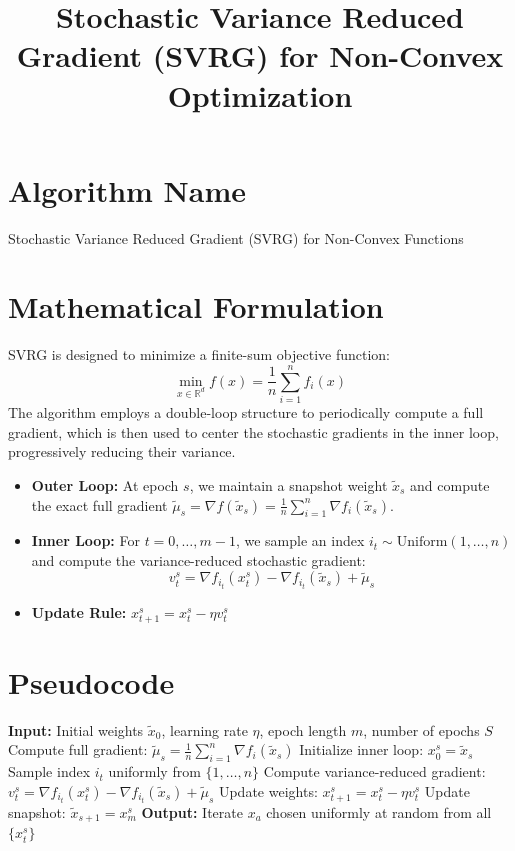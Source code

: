 \documentclass[11pt]{article}
\title{Stochastic Variance Reduced Gradient (SVRG) for Non-Convex Optimization}
\author{}
\date{}
\begin{document}
\maketitle

\section*{Algorithm Name}
Stochastic Variance Reduced Gradient (SVRG) for Non-Convex Functions

\section*{Mathematical Formulation}
SVRG is designed to minimize a finite-sum objective function:
\begin{equation}
    \min_{x \in \mathbb{R}^d} f(x) = \frac{1}{n} \sum_{i=1}^n f_i(x)
\end{equation}
The algorithm employs a double-loop structure to periodically compute a full gradient, which is then used to center the stochastic gradients in the inner loop, progressively reducing their variance.

\begin{itemize}
    \item \textbf{Outer Loop:} At epoch $s$, we maintain a snapshot weight $\tilde{x}_s$ and compute the exact full gradient $\tilde{\mu}_s = \nabla f(\tilde{x}_s) = \frac{1}{n}\sum_{i=1}^n \nabla f_i(\tilde{x}_s)$.
    \item \textbf{Inner Loop:} For $t = 0, \dots, m-1$, we sample an index $i_t \sim \text{Uniform}(1, \dots, n)$ and compute the variance-reduced stochastic gradient:
    \begin{equation}
        v_t^s = \nabla f_{i_t}(x_t^s) - \nabla f_{i_t}(\tilde{x}_s) + \tilde{\mu}_s
    \end{equation}
    \item \textbf{Update Rule:} $x_{t+1}^s = x_t^s - \eta v_t^s$
\end{itemize}

\section*{Pseudocode}
\begin{algorithm}[H]
\caption{Non-Convex SVRG}
\begin{algorithmic}[1]
\State \textbf{Input:} Initial weights $\tilde{x}_0$, learning rate $\eta$, epoch length $m$, number of epochs $S$
    \State Compute full gradient: $\tilde{\mu}_s = \frac{1}{n} \sum_{i=1}^n \nabla f_i(\tilde{x}_s)$
    \State Initialize inner loop: $x_0^s = \tilde{x}_s$
        \State Sample index $i_t$ uniformly from $\{1, \dots, n\}$
        \State Compute variance-reduced gradient: $v_t^s = \nabla f_{i_t}(x_t^s) - \nabla f_{i_t}(\tilde{x}_s) + \tilde{\mu}_s$
        \State Update weights: $x_{t+1}^s = x_t^s - \eta v_t^s$
    \EndFor
    \State Update snapshot: $\tilde{x}_{s+1} = x_m^s$
\EndFor
\State \textbf{Output:} Iterate $x_a$ chosen uniformly at random from all $\{x_t^s\}$
\end{algorithmic}
\end{algorithm}
\end{document}

